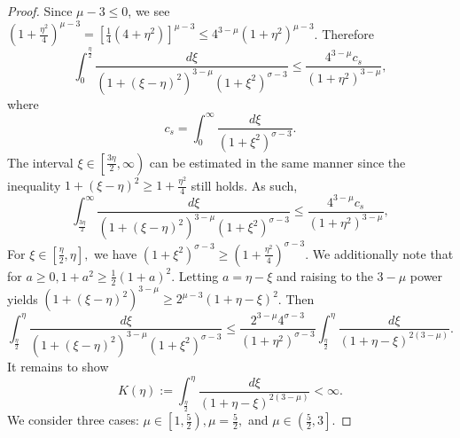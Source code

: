 \documentclass[10pt,a4paper]{amsart}
\begin{document}
\begin{proof}
Since $\mu - 3 \leq 0$, we see 
    $(1 + \frac{\eta^2}{4})^{\mu-3} = \left[\frac14( 4 + \eta^2)\right]^{\mu-3} \leq 4^{3-\mu}(1 + \eta^2)^{\mu-3}$.
Therefore 
\begin{equation}
    \int_0^{\frac{\eta}{2}}\frac{d \xi}{(1+(\xi - \eta)^2)^{3-\mu}(1 + \xi^2)^{\sigma-3}} 
        \leq \frac{4^{3-\mu}c_s}{(1+\eta^2)^{3-\mu}},
\end{equation}
where 
    \[c_s = \int_0^{\infty}\frac{d \xi}{(1 + \xi^2)^{\sigma-3}}.\]
The interval $\xi \in \left[\frac{3\eta}{2}, \infty
\right)$ can be estimated in the same manner since the inequality $1 + (\xi - \eta)^2 \geq 1 + \frac{\eta^2}{4}$ still holds. 
As such, 
\begin{equation}
    \int_{\frac{3\eta}{2}}^{\infty}\frac{d \xi}{(1+(\xi - \eta)^2)^{3-\mu}(1 + \xi^2)^{\sigma-3}} 
        \leq \frac{4^{3-\mu}c_s}{(1+\eta^2)^{3-\mu}},
\end{equation}
For $\xi \in \left[\frac\eta2,\eta\right],$ we have $(1 + \xi^2)^{\sigma - 3} \geq (1 + \frac{\eta^2}{4})^{\sigma-3}$. 
We additionally note that for $a \geq 0, 1 + a^2 \geq \frac12(1+a)^2.$
Letting $a = \eta - \xi$ and raising to the $3 - \mu$ power yields
    $(1 + (\xi - \eta)^2)^{3-\mu} \geq 2^{\mu - 3}(1 + \eta - \xi)^{2}$. 
Then 
\begin{equation}\label{J3}
    \int_{\frac{\eta}{2}}^{\eta}\frac{d \xi}{(1+(\xi - \eta)^2)^{3-\mu}(1 + \xi^2)^{\sigma-3}} 
        \leq \frac{2^{3-\mu}4^{\sigma-3}}{(1+\eta^2)^{\sigma-3}}\int_{\frac{\eta}{2}}^{\eta}\frac{d\xi}{(1+\eta-\xi)^{2(3-\mu)}}.
\end{equation}
It remains to show 
\begin{equation*}
    K(\eta) := 
         \int_{\frac{\eta}{2}}^{\eta}\frac{d\xi}{(1+\eta-\xi)^{2(3-\mu)}} < \infty.
\end{equation*}
We consider three cases: $\mu \in \left[1,\frac52\right), \mu = \frac52,$ and $\mu \in \left(\frac52, 3\right]$. 

\end{proof}
\end{document}
